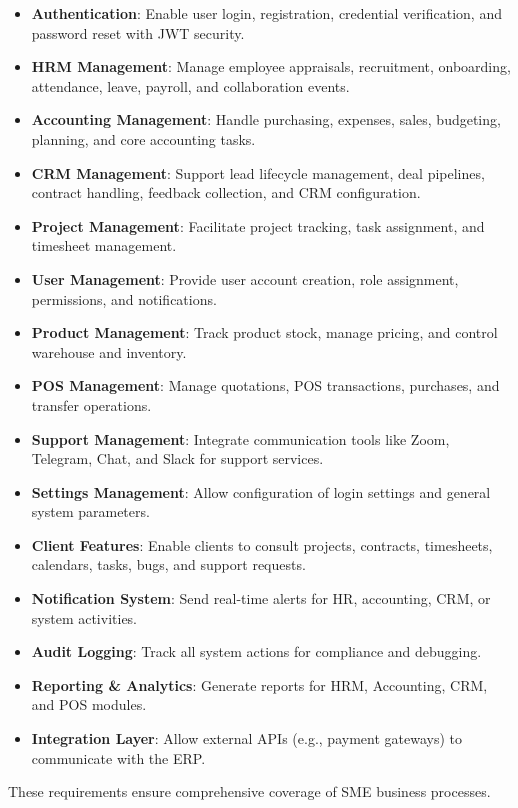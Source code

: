 \begin{itemize}
    \item \textbf{Authentication}: Enable user login, registration, credential verification, and password reset with JWT security.
    \item \textbf{HRM Management}: Manage employee appraisals, recruitment, onboarding, attendance, leave, payroll, and collaboration events.
    \item \textbf{Accounting Management}: Handle purchasing, expenses, sales, budgeting, planning, and core accounting tasks.
    \item \textbf{CRM Management}: Support lead lifecycle management, deal pipelines, contract handling, feedback collection, and CRM configuration.
    \item \textbf{Project Management}: Facilitate project tracking, task assignment, and timesheet management.
    \item \textbf{User Management}: Provide user account creation, role assignment, permissions, and notifications.
    \item \textbf{Product Management}: Track product stock, manage pricing, and control warehouse and inventory.
    \item \textbf{POS Management}: Manage quotations, POS transactions, purchases, and transfer operations.
    \item \textbf{Support Management}: Integrate communication tools like Zoom, Telegram, Chat, and Slack for support services.
    \item \textbf{Settings Management}: Allow configuration of login settings and general system parameters.
    \item \textbf{Client Features}: Enable clients to consult projects, contracts, timesheets, calendars, tasks, bugs, and support requests.
    \item \textbf{Notification System}: Send real-time alerts for HR, accounting, CRM, or system activities.
    \item \textbf{Audit Logging}: Track all system actions for compliance and debugging.
    \item \textbf{Reporting \& Analytics}: Generate reports for HRM, Accounting, CRM, and POS modules.
    \item \textbf{Integration Layer}: Allow external APIs (e.g., payment gateways) to communicate with the ERP.
\end{itemize}

These requirements ensure comprehensive coverage of SME business processes.

